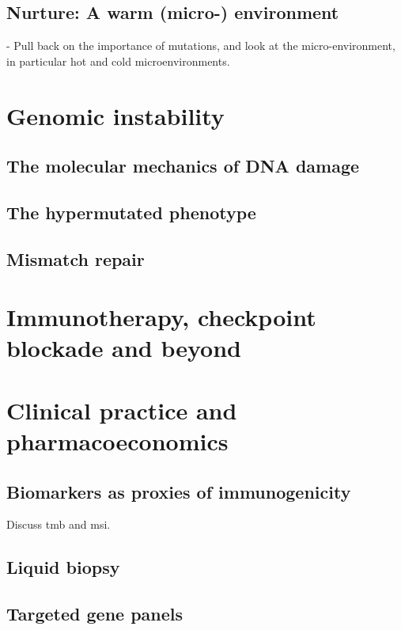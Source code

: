 \documentclass[10pt,twoside,openright]{report}
\begin{document}
\subsection{Nurture: A warm (micro-) environment}
- Pull back on the importance of mutations, and look at the micro-environment, in particular hot and cold microenvironments. \citep{keenan_genomic_2019} \citep{boulter_fibrotic_2020}



\section{Genomic instability}
\subsection{The molecular mechanics of DNA damage}
\subsection{The hypermutated phenotype}
\subsection{Mismatch repair}
\section{Immunotherapy, checkpoint blockade and beyond}


\section{Clinical practice and pharmacoeconomics}
\subsection{Biomarkers as proxies of immunogenicity}
Discuss \acrshort{tmb} and \acrshort{msi}.

\subsection{Liquid biopsy}
\citep{jensen_association_2020} \citep{genovese_clonal_2014} \citep{razavi_high-intensity_2019} \citep{schweizer_clinical_2019} \citep{annala_circulating_2018} \citep{goodall_circulating_2017}
\subsection{Targeted gene panels}
\end{document}
